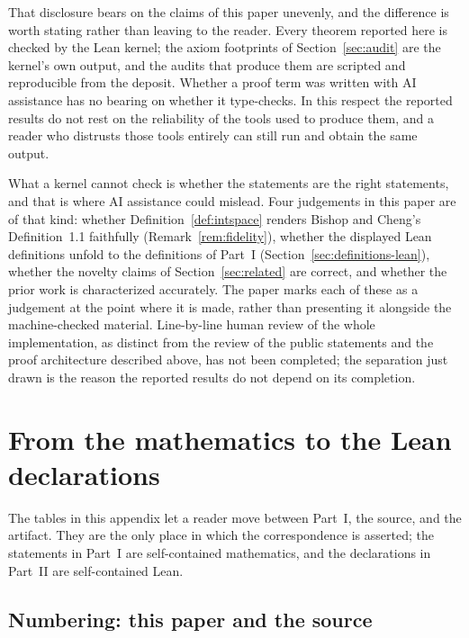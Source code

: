 \documentclass[11pt]{article}
\theoremstyle{definition}
\theoremstyle{remark}
\begin{document}
That disclosure bears on the claims of this paper unevenly, and the difference is worth stating rather than leaving to the reader.  Every theorem reported here is checked by the Lean kernel; the axiom footprints of Section~\ref{sec:audit} are the kernel's own output, and the audits that produce them are scripted and reproducible from the deposit.  Whether a proof term was written with AI assistance has no bearing on whether it type-checks.  In this respect the reported results do not rest on the reliability of the tools used to produce them, and a reader who distrusts those tools entirely can still run  and obtain the same output.

What a kernel cannot check is whether the statements are the right statements, and that is where AI assistance could mislead.  Four judgements in this paper are of that kind: whether Definition~\ref{def:intspace} renders Bishop and Cheng's Definition~1.1 faithfully (Remark~\ref{rem:fidelity}), whether the displayed Lean definitions unfold to the definitions of Part~I (Section~\ref{sec:definitions-lean}), whether the novelty claims of Section~\ref{sec:related} are correct, and whether the prior work is characterized accurately.  The paper marks each of these as a judgement at the point where it is made, rather than presenting it alongside the machine-checked material.  Line-by-line human review of the whole implementation, as distinct from the review of the public statements and the proof architecture described above, has not been completed; the separation just drawn is the reason the reported results do not depend on its completion.

\appendix

\section{From the mathematics to the Lean declarations}
\label{sec:appendix-map}

The tables in this appendix let a reader move between Part~I, the source, and the artifact.  They are the only place in which the correspondence is asserted; the statements in Part~I are self-contained mathematics, and the declarations in Part~II are self-contained Lean.

\subsection{Numbering: this paper and the source}
\label{sec:numbering}
\end{document}

